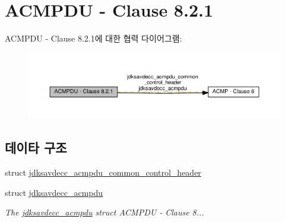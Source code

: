 \hypertarget{group__acmpdu}{}\section{A\+C\+M\+P\+DU -\/ Clause 8.2.1}
\label{group__acmpdu}
A\+C\+M\+P\+DU -\/ Clause 8.2.1에 대한 협력 다이어그램\+:
\nopagebreak
\begin{figure}[H]
\begin{center}
\leavevmode
\includegraphics[width=350pt]{group__acmpdu}
\end{center}
\end{figure}
\subsection*{데이타 구조}
\begin{DoxyCompactItemize}
\item 
struct \hyperlink{structjdksavdecc__acmpdu__common__control__header}{jdksavdecc\+\_\+acmpdu\+\_\+common\+\_\+control\+\_\+header}
\item 
struct \hyperlink{structjdksavdecc__acmpdu}{jdksavdecc\+\_\+acmpdu}
\begin{DoxyCompactList}\small\item\em The \hyperlink{structjdksavdecc__acmpdu}{jdksavdecc\+\_\+acmpdu} struct A\+C\+M\+P\+DU -\/ Clause 8... \end{DoxyCompactList}\end{DoxyCompactItemize}
